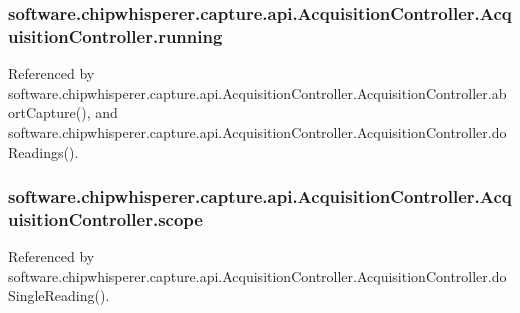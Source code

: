 \subsubsection[{running}]{\setlength{\rightskip}{0pt plus 5cm}software.\+chipwhisperer.\+capture.\+api.\+Acquisition\+Controller.\+Acquisition\+Controller.\+running}\label{classsoftware_1_1chipwhisperer_1_1capture_1_1api_1_1AcquisitionController_1_1AcquisitionController_af1d86ccae9fa550130d0d8513a1e746f}


Referenced by software.\+chipwhisperer.\+capture.\+api.\+Acquisition\+Controller.\+Acquisition\+Controller.\+abort\+Capture(), and software.\+chipwhisperer.\+capture.\+api.\+Acquisition\+Controller.\+Acquisition\+Controller.\+do\+Readings().

\hypertarget{classsoftware_1_1chipwhisperer_1_1capture_1_1api_1_1AcquisitionController_1_1AcquisitionController_ae0a2c331df9f5c72d8ad30cdfe0d26ce}{}
\subsubsection[{scope}]{\setlength{\rightskip}{0pt plus 5cm}software.\+chipwhisperer.\+capture.\+api.\+Acquisition\+Controller.\+Acquisition\+Controller.\+scope}\label{classsoftware_1_1chipwhisperer_1_1capture_1_1api_1_1AcquisitionController_1_1AcquisitionController_ae0a2c331df9f5c72d8ad30cdfe0d26ce}


Referenced by software.\+chipwhisperer.\+capture.\+api.\+Acquisition\+Controller.\+Acquisition\+Controller.\+do\+Single\+Reading().

\hypertarget{classsoftware_1_1chipwhisperer_1_1capture_1_1api_1_1AcquisitionController_1_1AcquisitionController_ab3d54bd7143dd8ecb838b69ebba5f460}{}
